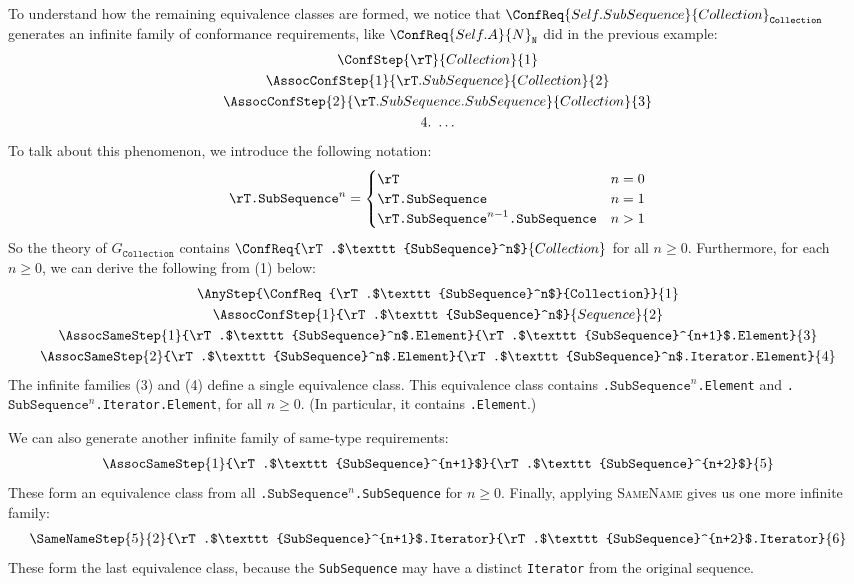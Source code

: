 \documentclass[../generics]{subfiles}
\begin{document}
\begin{example}
To understand how the remaining equivalence classes are formed, we notice that $\ConfReq{Self.SubSequence}{Collection}_\texttt{Collection}$ generates an infinite family of conformance requirements, like $\ConfReq{Self.A}{N}_\texttt{N}$ did in the previous example:
\begin{gather*}
\ConfStep{\rT}{Collection}{1}\\
\AssocConfStep{1}{\rT.SubSequence}{Collection}{2}\\
\AssocConfStep{2}{\rT.SubSequence.SubSequence}{Collection}{3}\\
4.\ \ldots
\end{gather*}
To talk about this phenomenon, we introduce the following notation:
\begin{gather*}
\texttt{\rT.$\texttt{SubSequence}^n$} = \begin{cases}
\rT&n=0\\
\texttt{\rT.SubSequence}&n=1\\
\texttt{\rT.SubSequence}^{n-1}\texttt{.SubSequence}&n>1
\end{cases}
\end{gather*}
So the theory of $G_\texttt{Collection}$ contains $\ConfReq{\rT.$\texttt{SubSequence}^n$}{Collection}$ for all $n\geq 0$. Furthermore, for each $n\geq 0$, we can derive the following from (1) below:
\begin{gather*}
\AnyStep{\ConfReq{\rT.$\texttt{SubSequence}^n$}{Collection}}{1}\\
\AssocConfStep{1}{\rT.$\texttt{SubSequence}^n$}{Sequence}{2}\\
\AssocSameStep{1}{\rT.$\texttt{SubSequence}^n$.Element}{\rT.$\texttt{SubSequence}^{n+1}$.Element}{3}\\
\AssocSameStep{2}{\rT.$\texttt{SubSequence}^n$.Element}{\rT.$\texttt{SubSequence}^n$.Iterator.Element}{4}
\end{gather*}
The infinite families (3) and (4) define a single equivalence class. This equivalence class contains \texttt{\rT.$\texttt{SubSequence}^n$.Element} and \texttt{\rT.$\texttt{SubSequence}^n$.Iterator.Element}, for all $n\geq 0$. (In particular, it contains \texttt{\rT.Element}.)

We can also generate another infinite family of same-type requirements:
\begin{gather*}
\AssocSameStep{1}{\rT.$\texttt{SubSequence}^{n+1}$}{\rT.$\texttt{SubSequence}^{n+2}$}{5}
\end{gather*}
These form an equivalence class from all \texttt{\rT.$\texttt{SubSequence}^n$.SubSequence} for $n\geq 0$. Finally, applying \textsc{SameName} gives us one more infinite family:
\begin{gather*}
\SameNameStep{5}{2}{\rT.$\texttt{SubSequence}^{n+1}$.Iterator}{\rT.$\texttt{SubSequence}^{n+2}$.Iterator}{6}
\end{gather*}
These form the last equivalence class, because the \texttt{SubSequence} may have a distinct \texttt{Iterator} from the original sequence.


\end{example}
\end{document}
